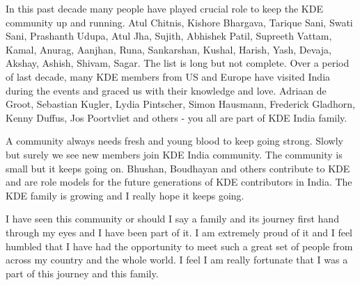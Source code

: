 In this past decade many people have played crucial role to keep the KDE community up and running. Atul Chitnis, Kishore Bhargava, Tarique Sani, Swati Sani, Prashanth Udupa, Atul Jha, Sujith, Abhishek Patil, Supreeth Vattam, Kamal, Anurag, Aanjhan, Runa, Sankarshan, Kushal, Harish, Yash, Devaja, Akshay, Ashish, Shivam, Sagar. The list is long but not complete. Over a period of last decade, many KDE members from US and Europe have visited India during the events and graced us with their knowledge and love. Adriaan de Groot, Sebastian Kugler, Lydia Pintscher, Simon Hausmann, Frederick Gladhorn, Kenny Duffus, Jos Poortvliet and others - you all are part of KDE India family.


A community always needs fresh and young blood to keep going strong. Slowly but surely we see new members join KDE India community. The community is small but it keeps going on. Bhushan, Boudhayan and others contribute to KDE and are role models for the future generations of KDE contributors in India. The KDE family is growing and I really hope it keeps going.

I have seen this community or should I say a family and its journey first hand through my eyes and I have been part of it. I am extremely proud of it and I feel humbled that I have had the opportunity to meet such a great set of people from across my country and the whole world. I feel I am really fortunate that I was a part of this journey and this family.